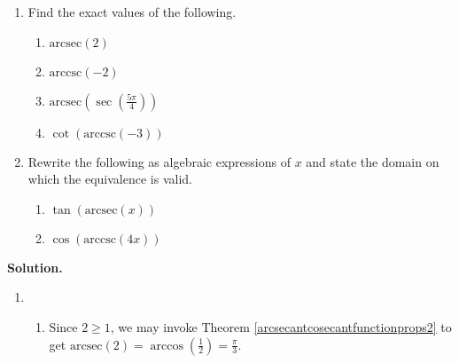 \begin{ex}  \label{arcsecantcosecantex2} $~$

\begin{enumerate}

\item  Find the exact values of the following.

\begin{multicols}{4}

\begin{enumerate}

\item $\mbox{arcsec}(2)$

\item  $\mbox{arccsc}(-2)$

\item  $\mbox{arcsec}\left( \sec\left( \frac{5\pi}{4} \right) \right)$

\item  $\cot\left(\mbox{arccsc}\left(-3\right)\right)$

\end{enumerate}

\end{multicols}

\enlargethispage{.25in}

\item  Rewrite the following as algebraic expressions of $x$ and state the domain on which the equivalence is valid.

\begin{multicols}{2}

\begin{enumerate}

\item  $\tan(\mbox{arcsec}(x))$

\item  $\cos(\mbox{arccsc}(4x))$ 

\end{enumerate}

\end{multicols}

\end{enumerate}

{\bf Solution.}

\begin{enumerate}
\item
\begin{enumerate}

\item  Since $2 \geq 1$, we may invoke Theorem \ref{arcsecantcosecantfunctionprops2} to get $\mbox{arcsec}(2) = \arccos\left(\frac{1}{2}\right) = \frac{\pi}{3}$.


\end{enumerate}
\end{enumerate}
\end{ex}
